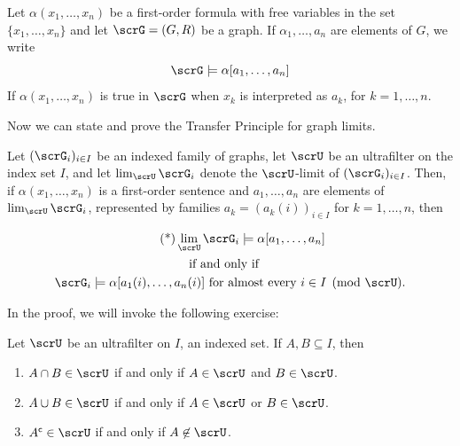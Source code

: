 \begin{notation}
  Let $\alpha(x_1,\dots, x_n)$ be a first-order formula with free variables in the set $\{x_1,\dots, x_n\}$ and let $\scrG=(G,R)$ be a graph.
  If $\alpha_1, \dots, a_n$ are elements of $G$, we write
  \[
    \scrG \models \alpha[a_1,\dots, a_n]
  \]
  If  $\alpha(x_1,\dots, x_n)$ is true in $\scrG$ when $x_k$ is interpreted as $a_k$, for $k=1,\dots, n$.
\end{notation}

Now we can state and prove the Transfer Principle for graph limits.

\begin{theorem}
  \label{thm:transfer-theorem}

  Let $(\scrG_i)_{i\in I}$ be an indexed family of graphs, let  $\scrU$ be an ultrafilter on the index set $I$, and let $\lim_{\scrU} \scrG_i$ denote the $\scrU$-limit of  $(\scrG_i)_{i\in I}$.
  Then, if $\alpha(x_1,\dots, x_n)$ is a first-order sentence and $a_1,\dots, a_n$ are elements of  $\lim_{\scrU} \scrG_i$, represented by families $a_k=(a_k(i))_{i\in I}$ for $k=1,\dots, n$, then

  \[
    \begin{gathered}\tag{*}
    \lim_{\scrU} \scrG_i \models \alpha[a_1,\dots, a_n]\\
    \quad\text{if and only if}\qquad\\
    \text{$\scrG_i\models \alpha[a_1(i),\dots, a_n(i)] $ for almost every $i\in I \pmod{\scrU}$.}
    \end{gathered}
  \]
\end{theorem}

In the proof, we will invoke the following exercise:

\begin{exercise}
  \label{exe:lemma-los}
  Let $\scrU$ be an ultrafilter on $I$, an indexed set.
  If $A,B\subseteq I$, then
  \begin{enumerate}
  \item
    $A \cap B \in \scrU$ if and only if $A \in \scrU$ and $B \in \scrU$.
  \item
    $A \cup B \in \scrU$ if and only if $A \in \scrU$ or $B \in \scrU$.
  \item
    $A^\mathsf{c} \in \scrU$ if and only if $A \not\in \scrU$.
  \end{enumerate}
\end{exercise}

